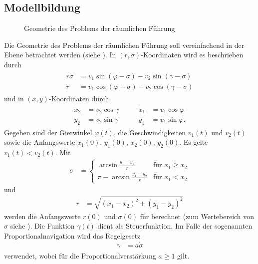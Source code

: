 \subsection{Modellbildung}
\begin{figure}[htb]
	\centering
	
	\caption{Geometrie des Problems der räumlichen Führung}
	\label{fig:kap_3_bsp_rf_geometrie}
\end{figure}
Die Geometrie des Problems der räumlichen Führung  soll vereinfachend in der Ebene betrachtet werden (siehe ). In $(r,\sigma)$-Koordinaten wird es
beschrieben durch
\begin{align}
	\begin{split}\label{eqn:kap_3_bsp_rf_rskoord}
		r\dot{\sigma} & = v_1\sin(\varphi - \sigma) - v_2\sin(\gamma - \sigma)\\
		\dot{r} & = v_1\cos(\varphi - \sigma) - v_2\cos(\gamma - \sigma)
	\end{split}
\end{align}
und in $(x,y)$-Koordinaten durch
\begin{align}
	\begin{aligned}\label{eqn:kap_3_bsp_rf_xykoord}
		\dot{x}_2 & = v_2 \cos \gamma  & \qquad \dot{x}_1 & = v_1 \cos \varphi\\
		\dot{y}_2 & = v_2 \sin \gamma  & \qquad \dot{y}_1 & = v_1 \sin \varphi.
	\end{aligned}
\end{align}
Gegeben sind der Gierwinkel $\varphi(t)$, die Geschwindigkeiten $v_1(t)$ und $v_2(t)$ sowie die Anfangswerte $x_1(0)$, $y_1(0)$, $x_2(0)$, $y_2(0)$. Es gelte $v_1(t) < v_2(t)$. Mit
\begin{align}\label{eqn:kap_3_bsp_rf_sigma}
\sigma & = \left\{ \begin{array}{rl}
	\arcsin\frac{y_1-y_2}{r}	& \text{für } x_1\geq x_2\\
	\pi-\arcsin\frac{y_1-y_2}{r} & \text{für } x_1 < x_2
\end{array} \right.
\end{align}
und
\begin{align}
	r & = \sqrt{ (x_1 - x_2)^2 + (y_1 - y_2)^2 } \label{eqn:kap_3_bsp_rf_regelgesetz}
\end{align}
werden die Anfangswerte $r(0)$ und $\sigma(0)$ für  berechnet (zum Wertebereich von $\sigma$ siehe ). Die Funktion
$\gamma(t)$ dient als Steuerfunktion. Im Falle der sogenannten Proportionalnavigation wird das Regelgesetz
\begin{align}
	\dot{\gamma} & = a \dot{\sigma}	\label{eqn:kap_3_bsp_rf_regelgesetz}
\end{align}
verwendet, wobei für die Proportionalverstärkung $a\geq 1$ gilt.

